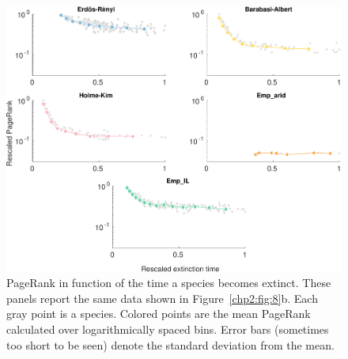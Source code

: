 \begin{figure}[h]
    \centering
    \includegraphics[width=\textwidth]{figures/chp2/figSI2_comp.pdf}
    \caption[Evolution of PageRank of extinct species]{PageRank in function of the time a species becomes extinct. These panels report the same data shown in Figure~\ref{chp2:fig:8}b. Each gray point is a species. Colored points are the mean PageRank calculated over logarithmically spaced bins. Error bars (sometimes too short to be seen) denote the standard deviation from the mean.}
    \label{chp2:fig:SI2_comp}
\end{figure}


